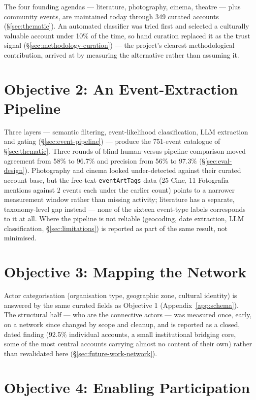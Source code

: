 \documentclass[12pt, a4paper]{report}
\begin{document}
The four founding agendas — literature, photography, cinema, theatre —
plus community events, are maintained today through 349 curated accounts
(\S\ref{sec:thematic}). An automated classifier was tried first and
selected a culturally valuable account under 10\% of the time, so hand
curation replaced it as the trust signal (\S\ref{sec:methodology-curation})
— the project's clearest methodological contribution, arrived at by
measuring the alternative rather than assuming it.

\section{Objective 2: An Event-Extraction Pipeline}

Three layers — semantic filtering, event-likelihood classification, LLM
extraction and gating (\S\ref{sec:event-pipeline}) — produce the
751-event catalogue of \S\ref{sec:thematic}. Three rounds of blind
human-versus-pipeline comparison moved agreement from 58\% to 96.7\% and
precision from 56\% to 97.3\% (\S\ref{sec:eval-design}). Photography and
cinema looked under-detected against their curated account base, but the
free-text \texttt{eventArtTags} data (25 Cine, 11 Fotografía mentions
against 2 events each under the earlier count) points to a narrower
measurement window rather than missing activity; literature has a
separate, taxonomy-level gap instead — none of the sixteen event-type
labels corresponds to it at all. Where the pipeline is not reliable
(geocoding, date extraction, LLM classification, \S\ref{sec:limitations})
is reported as part of the same result, not minimised.

\section{Objective 3: Mapping the Network}

Actor categorisation (organisation type, geographic zone, cultural
identity) is answered by the same curated fields as Objective 1
(Appendix~\ref{app:schema}). The structural half — who are the
connective actors — was measured once, early, on a network since changed
by scope and cleanup, and is reported as a closed, dated finding (92.5\%
individual accounts, a small institutional bridging core, some of the
most central accounts carrying almost no content of their own) rather
than revalidated here (\S\ref{sec:future-work-network}).

\section{Objective 4: Enabling Participation}
\end{document}
